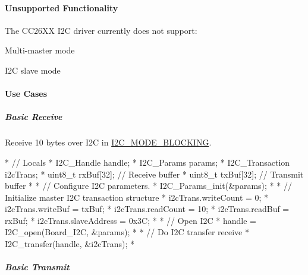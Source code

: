 \paragraph*{Unsupported Functionality}

The C\-C26\-X\-X I2\-C driver currently does not support\-:
\begin{DoxyItemize}
\item Multi-\/master mode
\item I2\-C slave mode
\end{DoxyItemize}

\paragraph*{Use Cases\label{_i2_c_c_c26_x_x_8h_I2C_USE_CASES}%
\hypertarget{_i2_c_c_c26_x_x_8h_I2C_USE_CASES}{}%
}

\subparagraph*{Basic Receive}

Receive 10 bytes over I2\-C in \hyperlink{_i2_c_8h_a39f3b9340fc4ee241b0d2da9b2841c26abe065350be2a0ae5c9beb24624626c75}{I2\-C\-\_\-\-M\-O\-D\-E\-\_\-\-B\-L\-O\-C\-K\-I\-N\-G}. 
\begin{DoxyCode}
*  \textcolor{comment}{// Locals}
*  I2C_Handle handle;
*  I2C_Params params;
*  I2C_Transaction i2cTrans;
*  uint8\_t rxBuf[32];      \textcolor{comment}{// Receive buffer}
*  uint8\_t txBuf[32];      \textcolor{comment}{// Transmit buffer}
*
*  \textcolor{comment}{// Configure I2C parameters.}
*  I2C_Params_init(&params);
*
*  \textcolor{comment}{// Initialize master I2C transaction structure}
*  i2cTrans.writeCount   = 0;
*  i2cTrans.writeBuf     = txBuf;
*  i2cTrans.readCount    = 10;
*  i2cTrans.readBuf      = rxBuf;
*  i2cTrans.slaveAddress = 0x3C;
*
*  \textcolor{comment}{// Open I2C}
*  handle = I2C_open(Board\_I2C, &params);
*
*  \textcolor{comment}{// Do I2C transfer receive}
*  I2C_transfer(handle, &i2cTrans);
*  
\end{DoxyCode}


\subparagraph*{Basic Transmit}

